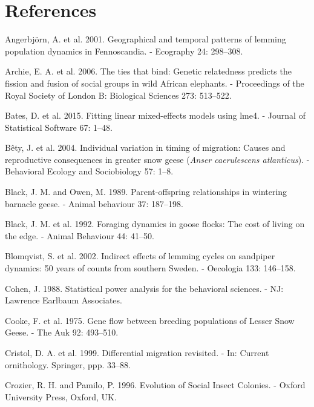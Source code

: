\documentclass[10pt,twocolumn]{paper}
\begin{document}
\section{References}\label{references}

\small

\hypertarget{refs}{}
\hypertarget{ref-angerbjorn2001geographical}{}
Angerbjörn, A. et al. 2001. Geographical and temporal patterns of
lemming population dynamics in Fennoscandia. - Ecography 24: 298--308.

\hypertarget{ref-Archie513}{}
Archie, E. A. et al. 2006. The ties that bind: Genetic relatedness
predicts the fission and fusion of social groups in wild African
elephants. - Proceedings of the Royal Society of London B: Biological
Sciences 273: 513--522.

\hypertarget{ref-lme4}{}
Bates, D. et al. 2015. Fitting linear mixed-effects models using lme4. -
Journal of Statistical Software 67: 1--48.

\hypertarget{ref-Buxeaty2004}{}
Bêty, J. et al. 2004. Individual variation in timing of migration:
Causes and reproductive consequences in greater snow geese (\emph{Anser
caerulescens atlanticus}). - Behavioral Ecology and Sociobiology 57:
1--8.

\hypertarget{ref-black1989parent}{}
Black, J. M. and Owen, M. 1989. Parent-offspring relationships in
wintering barnacle geese. - Animal behaviour 37: 187--198.

\hypertarget{ref-black1992foraging}{}
Black, J. M. et al. 1992. Foraging dynamics in goose flocks: The cost of
living on the edge. - Animal Behaviour 44: 41--50.

\hypertarget{ref-blomqvist2002indirect}{}
Blomqvist, S. et al. 2002. Indirect effects of lemming cycles on
sandpiper dynamics: 50 years of counts from southern Sweden. - Oecologia
133: 146--158.

\hypertarget{ref-cohen1988statistical}{}
Cohen, J. 1988. Statistical power analysis for the behavioral sciences.
- NJ: Lawrence Earlbaum Associates.

\hypertarget{ref-cooke1975gene}{}
Cooke, F. et al. 1975. Gene flow between breeding populations of Lesser
Snow Geese. - The Auk 92: 493--510.

\hypertarget{ref-cristol1999differential}{}
Cristol, D. A. et al. 1999. Differential migration revisited. - In:
Current ornithology. Springer, ppp. 33--88.

\hypertarget{ref-crozier1996evolution}{}
Crozier, R. H. and Pamilo, P. 1996. Evolution of Social Insect Colonies.
- Oxford University Press, Oxford, UK.
\end{document}
